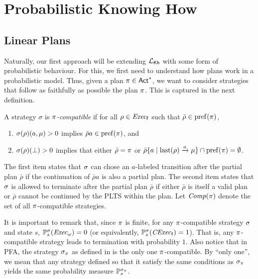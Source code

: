 \section{Probabilistic Knowing How}

\subsection{Linear Plans}

Naturally, our first approach will be extending $\mathcal{L}_{{\mathsf{Kh}}}$ with some
form of probabilistic behaviour.  For this, we first need to
understand how plans work in a probabilistic model.
%
Thus, given a plan $\pi\in{\rm \sf Act}^*$, we want to consider
strategies that follow as faithfully as possible the plan
$\pi$. This is captured in the next definition.

\begin{definition}\label{def:plan:compat}
  A strategy $\sigma$ is \emph{$\pi$-compatible} if for all
  $\rho\in\mathit{Exec}_{\mathsf{f}}$ such that $\bar{\rho}\in\mathrm{pref}(\pi)$,
  \begin{enumerate}
  \item%
    $\sigma(\rho)(a,\mu)>0$ implies $\bar{\rho}a\in\mathrm{pref}(\pi)$, and
  \item%
    $\sigma(\rho)(\bot)>0$ implies that either
    $\bar{\rho}=\pi$ or
    $\bar{\rho}\{a\mid{\mathrm{last}(\rho)\xrightarrow{a}\mu}\}\cap\mathrm{pref}(\pi) = \emptyset$. 
  \end{enumerate}
\end{definition}
%
The first item states that $\sigma$ can chose an $a$-labeled
transition after the partial plan $\bar{\rho}$ if the continuation of
$\bar{\rho}a$ is also a partial plan.
%
The second item states that $\sigma$ is allowed to terminate after the
partial plan $\bar{\rho}$ if either $\bar{\rho}$ is itself a valid
plan or $\bar{\rho}$ cannot be continued by the PLTS within the plan.
%
Let $\mathit{Comp}(\pi)$ denote the set of all $\pi$-compatible
strategies.

It is important to remark that, since $\pi$ is finite, for any
$\pi$-compatible strategy $\sigma$ and state $s$,
$\mathbb{P}^\sigma_s(\mathit{Exec}_\omega)=0$ (or equivalently,
$\mathbb{P}^\sigma_s(\mathit{CExec}_{\mathsf{f}})=1$).  That is, any $\pi$-compatible
strategy leads to termination with probability $1$.
%
Also notice that in PFA, the strategy $\sigma_\pi$ as defined in
 is the only one $\pi$-compatible.  By
``only one'', we mean that any strategy defined so that it satisfy the
same conditions as $\sigma_\pi$ yields the same probability measure
$\mathbb{P}_s^{\sigma_\pi}$.


